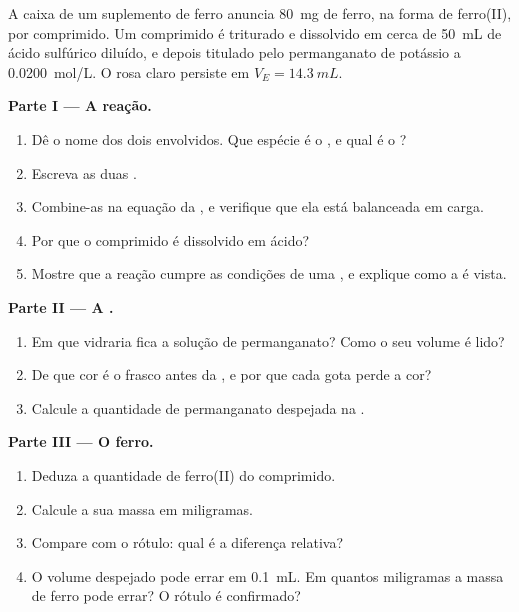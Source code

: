 \begin{problem}
\label{pb:g11:titration:1}
A caixa de um suplemento de ferro anuncia \qty{80}{mg} de ferro, na
forma de ferro(II), por comprimido. Um comprimido é triturado e
dissolvido em cerca de \qty{50}{mL} de ácido sulfúrico diluído, e depois
titulado pelo permanganato de potássio a \qty{0.0200}{mol/L}. O rosa
claro persiste em $V_E = \qty{14.3}{mL}$.

\medskip
\noindent\textbf{Parte I --- A reação.}
\begin{enumerate}
  \item Dê o nome dos dois  envolvidos. Que espécie é o
        , e qual é o ?
  \item Escreva as duas .
  \item Combine-as na equação da , e verifique que ela está
        balanceada em carga.
  \item Por que o comprimido é dissolvido em ácido?
  \item Mostre que a reação cumpre as condições de uma , e
        explique como a  é vista.
\end{enumerate}

\medskip
\noindent\textbf{Parte II --- A .}
\begin{enumerate}[resume]
  \item Em que vidraria fica a solução de permanganato? Como o seu
        volume é lido?
  \item De que cor é o frasco antes da , e por que cada gota
        perde a cor?
  \item Calcule a quantidade de permanganato despejada na .
\end{enumerate}

\medskip
\noindent\textbf{Parte III --- O ferro.}
\begin{enumerate}[resume]
  \item Deduza a quantidade de ferro(II) do comprimido.
  \item Calcule a sua massa em miligramas.
  \item Compare com o rótulo: qual é a diferença relativa?
  \item O volume despejado pode errar em \qty{0.1}{mL}. Em quantos
        miligramas a massa de ferro pode errar? O rótulo é confirmado?
\end{enumerate}


\end{problem}
